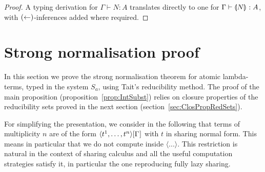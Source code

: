 \documentclass{llncs} %
\begin{document}
\begin{proof}
%
A typing derivation for $\Gamma \vdash N : A$ translates directly to one for $\Gamma\vdash {\llparenthesis{N}\rrparenthesis_{{}}} : A$, with $({\leftarrow})$-inferences added where required.
\end{proof}




\section{Strong normalisation proof}\label{sec:SNproof}

In this section we prove the strong normalisation theorem for atomic lambda-terms, typed in the system $S_a$,
using Tait's reducibility method. The proof of the main proposition (proposition~\ref{prop:IntSubst}) relies on closure properties of the reducibility sets proved in the next section (section~\ref{sec:ClosPropRedSets}).

For simplifying the presentation, we consider in the following that terms of multiplicity $n$ are of the form $\langle t^1,\dots, t^n \rangle\G$ with $t$ in sharing normal form. This means in particular that we do not compute inside $\langle ... \rangle$. This
restriction is  natural in the context of sharing calculus and all the useful computation strategies satisfy it, in particular the one reproducing fully lazy sharing.
\end{document}
